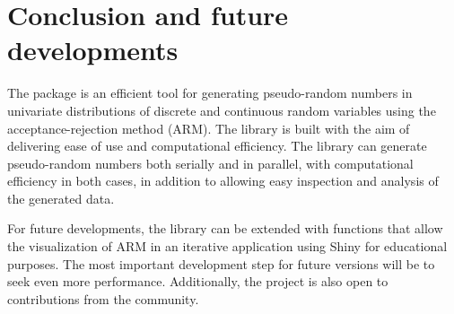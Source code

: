 \section{Conclusion and future developments}\label{conclusion-and-future-developments}

The  package is an efficient tool for generating pseudo-random numbers in univariate distributions of discrete and continuous random variables using the acceptance-rejection method (ARM). The library is built with the aim of delivering ease of use and computational efficiency. The  library can generate pseudo-random numbers both serially and in parallel, with computational efficiency in both cases, in addition to allowing easy inspection and analysis of the generated data.

For future developments, the  library can be extended with functions that allow the visualization of ARM in an iterative application using Shiny for educational purposes. The most important development step for future versions will be to seek even more performance. Additionally, the project is also open to contributions from the community.



\address{%
Pedro Rafael Diniz Marinho\\
Federal University of Paraíba\\%
Department of Statistics\\ Cidade Universitária, s/n, Departamento de Estatística - UFPB\\
%
\url{https://github.com/prdm0}\\%
\textit{ORCiD: \href{https://orcid.org/0000-0003-1591-8300}{0000-0003-1591-8300}}\\%
\href{mailto:pedro.rafael.mariho@gmail.com}{\nolinkurl{pedro.rafael.mariho@gmail.com}}%
}

\address{%
Vera L. D. Tomazella\\
Federal University of São Carlos\\%
Department of Statistics\\ Rodovia Washington Luiz, Km 235, Monjolinho\\
%
\url{https://www.servidores.ufscar.br/vera/}\\%
\textit{ORCiD: \href{https://orcid.org/0000-0002-6780-2089}{0000-0002-6780-2089}}\\%
\href{mailto:vera@ufscar.br}{\nolinkurl{vera@ufscar.br}}%
}
